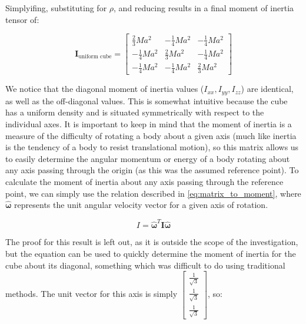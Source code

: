 Simplyifing, substituting for $\rho$, and reducing results in a final moment of inertia tensor of:

\[\bm{I}_{\text{uniform cube}} =  \begin{bmatrix} \frac{2}{3}Ma^2 & -\frac{1}{4}Ma^2 & -\frac{1}{4}Ma^2 \\ -\frac{1}{4}Ma^2 & \frac{2}{3}Ma^2 & -\frac{1}{4}Ma^2 \\ -\frac{1}{4}Ma^2 & -\frac{1}{4}Ma^2 & \frac{2}{3}Ma^2\end{bmatrix}\]

We notice that the diagonal moment of inertia values ($I_{xx}, I_{yy}, I_{zz}$) are identical, as well as the off-diagonal values. This is somewhat intuitive because the cube has a uniform density and is situated symmetrically with respect to the individual axes. It is important to keep in mind that the moment of inertia is a measure of the difficulty of rotating a body about a given axis (much like inertia is the tendency of a body to resist translational motion), so this matrix allows us to easily determine the angular momentum or energy of a body rotating about any axis passing through the origin (as this was the assumed reference point). To calculate the moment of inertia about any axis passing through the reference point, we can simply use the relation described in \cref{eq:matrix_to_moment}, where $\bm{\hat{\omega}}$ represents the unit angular velocity vector for a given axis of rotation. 

\begin{equation}
I = \bm{\hat{\omega}}^T\bm{I}\bm{\hat{\omega}}
\label{eq:matrix_to_moment}
\end{equation}

The proof for this result is left out, as it is outside the scope of the investigation, but the equation can be used to quickly determine the moment of inertia for the cube about its diagonal, something which was difficult to do using traditional methods. The unit vector for this axis is simply $\begin{bmatrix}\frac{1}{\sqrt{3}} \\ \frac{1}{\sqrt{3}} \\ \frac{1}{\sqrt{3}}\end{bmatrix}$, so:

